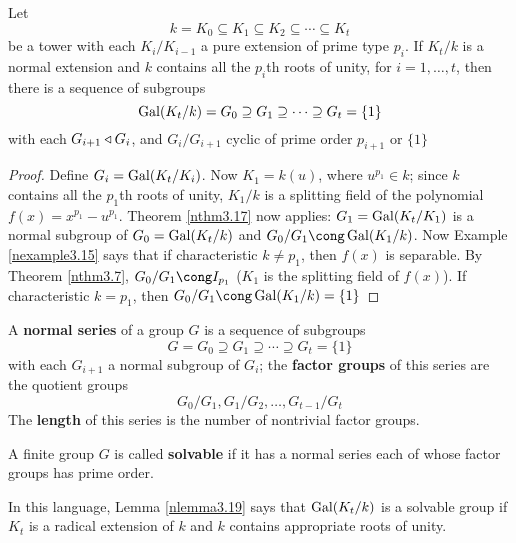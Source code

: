 \documentclass[11pt]{article}
\begin{document}
\begin{lemma}[]
\label{nlemma3.19}
Let 
\begin{equation*}
k=K_0\subseteq K_1\subseteq K_2\subseteq\cdots\subseteq K_t
\end{equation*}
be a tower with each \(K_i/K_{i-1}\)  a pure extension of prime type
\(p_i\). If \(K_t/k\) is a normal extension and \(k\) contains all the
\(p_i\)th roots of unity, for \(i=1,\dots,t\), then there is a sequence of
subgroups
\begin{equation*}
\operatorname{Gal}(K_t/k)=G_0\supseteq G_1\supseteq\cdots\supseteq G_t=\{1\}
\end{equation*}
with each \(G_{i+1}\triangleleft G_i\), and \(G_i/G_{i+1}\) cyclic of prime order
\(p_{i+1}\) or \(\{1\}\)
\end{lemma}

\begin{proof}
Define \(G_i=\operatorname{Gal}(K_t/K_i)\). Now \(K_1=k(u)\), where \(u^{p_1}\in k\);
since \(k\) contains all the \(p_1\)th roots of unity, \(K_1/k\) is a
splitting field of the polynomial \(f(x)=x^{p_1}-u^{p_1}\). Theorem
\ref{nthm3.17} now applies: \(G_1=\operatorname{Gal}(K_t/K_1)\) is a normal subgroup of
\(G_0=\operatorname{Gal}(K_t/k)\) and \(G_0/G_1\cong\Gal(K_1/k)\). Now Example
\ref{nexample3.15} says that if characteristic \(k\neq p_1\), then \(f(x)\) is
separable. By Theorem \ref{nthm3.7}, \(G_0/G_1\cong\I_{p_1}\) (\(K_1\) is the
splitting field of \(f(x)\)). If characteristic \(k=p_1\), then 
\(G_0/G_1\cong\Gal(K_1/k)=\{1\}\)
\end{proof}

\begin{definition}[]
A \textbf{normal series} of a group \(G\) is a sequence of subgroups
\begin{equation*}
G=G_0\supseteq G_1\supseteq\cdots\supseteq G_t=\{1\}
\end{equation*}
with each \(G_{i+1}\) a normal subgroup of \(G_i\); the \textbf{factor groups} of
this series are the quotient groups
\begin{equation*}
G_0/G_1,G_1/G_2,\dots,G_{t-1}/G_t
\end{equation*}
The \textbf{length} of this series is the number of nontrivial factor groups.

A finite group \(G\) is called \textbf{solvable} if it has a normal series each of
whose factor groups has prime order.
\end{definition}

In this language, Lemma \ref{nlemma3.19} says that \(\operatorname{Gal}(K_t/k)\) is a
solvable group if \(K_t\) is a radical extension of \(k\) and \(k\) contains
appropriate roots of unity.
\end{document}
